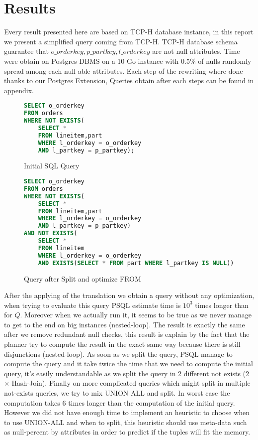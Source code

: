 \section{Results}
Every result presented here are based on TCP-H database instance, in this report we present a simplified query coming from TCP-H.
TCP-H database schema guarantee that $o\_orderkey, p\_partkey, l\_orderkey$  are not null attributes. 
Time were obtain on Postgres DBMS on a 10 Go instance with 0.5\% of nulls randomly spread among each null-able attributes. Each step of the rewriting where done thanks to our Postgres Extension, Queries obtain after each steps can be found in appendix. 

\begin{figure}[H]
	\caption{\label{query_ex} Initial SQL Query}
	\begin{lstlisting}[language=SQL]
SELECT o_orderkey
FROM orders
WHERE NOT EXISTS(
	SELECT *
	FROM lineitem,part
	WHERE l_orderkey = o_orderkey
	AND l_partkey = p_partkey);
	\end{lstlisting}
\end{figure}

\begin{figure}[H]
	\caption{\label{query_ex_4} Query after Split and optimize FROM}
	\begin{lstlisting}[language=SQL]
SELECT o_orderkey
FROM orders
WHERE NOT EXISTS(
	SELECT *
	FROM lineitem,part
	WHERE l_orderkey = o_orderkey
	AND l_partkey = p_partkey)
AND NOT EXISTS(
	SELECT *
	FROM lineitem
	WHERE l_orderkey = o_orderkey
	AND EXISTS(SELECT * FROM part WHERE l_partkey IS NULL));
	\end{lstlisting}
\end{figure}

After the applying of the translation we obtain a query without any optimization, when trying to evaluate this query PSQL estimate time is $10^3$ times longer than for $Q$. Moreover when we actually run it, it seems to be true as we never manage to get to the end on big instances (nested-loop).
The result is exactly the same after we remove redundant null checks, this result is explain by the fact that the planner try to compute the result in the exact same way because there is still disjunctions (nested-loop).
As soon as we split the query, PSQL manage to compute the query and it take twice the time that we need to compute the initial query, it's easily understandable as we split the query in 2 different not exists (2 $\times$ Hash-Join).
Finally on more complicated queries which might split in multiple not-exists queries, we try to mix UNION ALL and split. In worst case the computation takes 6 times longer than the computation of the initial query. However we did not have enough time to implement an heuristic to choose when to use UNION-ALL and when to split, this heuristic should use meta-data such as null-percent by attributes in order to predict if the tuples will fit the memory.

